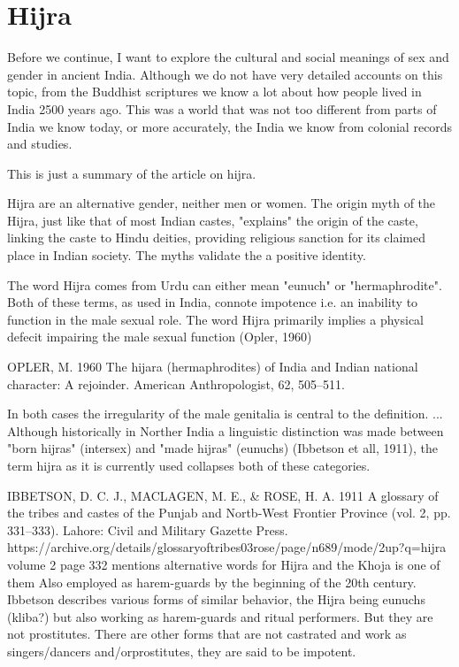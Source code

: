\section{Hijra}

Before we continue, I want to explore the cultural and social meanings of sex and gender in ancient India. Although we do not have very detailed accounts on this topic, from the Buddhist scriptures we know a lot about how people lived in India 2500 years ago. This was a world that was not too different from parts of India we know today, or more accurately, the India we know from colonial records and studies.

This is just a summary of the article on hijra.

Hijra are an alternative gender, neither men or women. The origin myth of the Hijra, just like that of most Indian castes, "explains" the origin of the caste, linking the caste to Hindu deities, providing religious sanction for its claimed place in Indian society. The myths validate the a positive identity. 

The word Hijra comes from Urdu can either mean "eunuch" or "hermaphrodite". Both of these terms, as used in India, connote impotence i.e. an inability to function in the male sexual role. The word Hijra primarily implies a physical defecit impairing the male sexual function (Opler, 1960)

OPLER, M.
1960 The hijara (hermaphrodites) of India and Indian national character: A rejoinder. American Anthropologist, 62, 505–511.

In both cases the irregularity of the male genitalia is central to the definition. ... Although historically in Norther India a linguistic distinction was made between "born hijras" (intersex) and "made hijras" (eunuchs) (Ibbetson et all, 1911), the term hijra as it is currently used collapses both of these categories.

IBBETSON, D. C. J., MACLAGEN, M. E., & ROSE, H. A.
1911 A glossary of the tribes and castes of the Punjab and Nortb-West Frontier Province (vol. 2, pp. 331–333). Lahore: Civil and Military Gazette Press.
https://archive.org/details/glossaryoftribes03rose/page/n689/mode/2up?q=hijra
volume 2 page 332 mentions alternative words for Hijra and the Khoja is one of them
Also employed as harem-guards by the beginning of the 20th century.
Ibbetson describes various forms of similar behavior, the Hijra being eunuchs (kliba?) but also working as harem-guards and ritual performers. But they are not prostitutes.
There are other forms that are not castrated and work as singers/dancers and/orprostitutes, they are said to be impotent.

